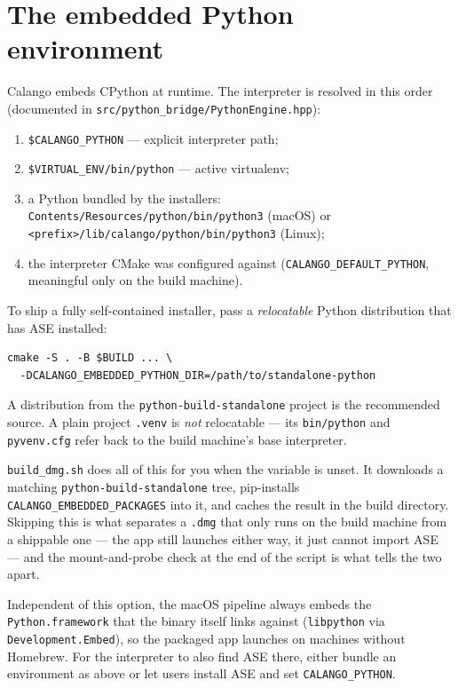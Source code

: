 \documentclass[11pt,a4paper]{article}
\newcommand{\file}[1]{\texttt{#1}}
\newcommand{\opt}[1]{\texttt{#1}}
\begin{document}
\section{The embedded Python environment}
\label{sec:python-embed}

Calango embeds CPython at runtime. The interpreter is resolved in this
order (documented in \file{src/python\_bridge/PythonEngine.hpp}):

\begin{enumerate}[itemsep=1pt]
  \item \texttt{\$CALANGO\_PYTHON} --- explicit interpreter path;
  \item \texttt{\$VIRTUAL\_ENV/bin/python} --- active virtualenv;
  \item a Python bundled by the installers:
        \file{Contents/Resources/python/bin/python3} (macOS) or
        \file{<prefix>/lib/calango/python/bin/python3} (Linux);
  \item the interpreter CMake was configured against
        (\opt{CALANGO\_DEFAULT\_PYTHON}, meaningful only on the build
        machine).
\end{enumerate}

To ship a fully self-contained installer, pass a \emph{relocatable}
Python distribution that has ASE installed:

\begin{lstlisting}
cmake -S . -B $BUILD ... \
  -DCALANGO_EMBEDDED_PYTHON_DIR=/path/to/standalone-python
\end{lstlisting}

A distribution from the \texttt{python-build-standalone} project is the
recommended source. A plain project \file{.venv} is \emph{not}
relocatable --- its \file{bin/python} and \file{pyvenv.cfg} refer back to
the build machine's base interpreter.

\file{build\_dmg.sh} does all of this for you when the variable is
unset. It downloads a matching \texttt{python-build-standalone} tree,
pip-installs
\opt{CALANGO\_EMBEDDED\_PACKAGES} into it, and caches the result in the
build directory. Skipping this is what separates a \file{.dmg} that
only runs on the build machine from a shippable one --- the app still
launches either way, it just cannot import ASE --- and the mount-and-probe
check at the end of the script is what tells the two apart.

Independent of this option, the macOS pipeline always embeds the
\file{Python.framework} that the binary itself links against
(\file{libpython} via \opt{Development.Embed}), so the packaged app
launches on machines without Homebrew. For the interpreter to also find
ASE there, either bundle an environment as above or let users install
ASE and set \texttt{CALANGO\_PYTHON}.
\end{document}
